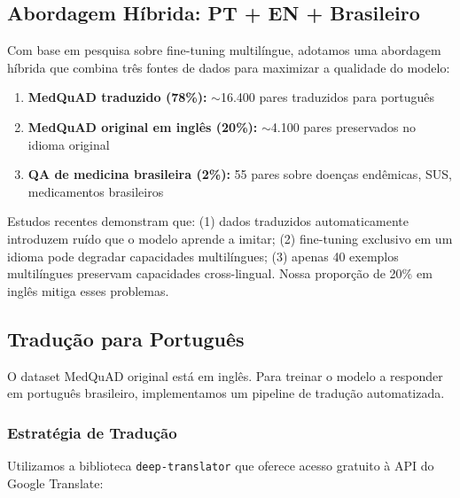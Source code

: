 \subsection{Abordagem Híbrida: PT + EN + Brasileiro}
\label{subsec:abordagem-hibrida}

Com base em pesquisa sobre fine-tuning multilíngue, adotamos uma abordagem híbrida que combina três fontes de dados para maximizar a qualidade do modelo:

\begin{enumerate}
    \item \textbf{MedQuAD traduzido (78\%):} $\sim$16.400 pares traduzidos para português
    \item \textbf{MedQuAD original em inglês (20\%):} $\sim$4.100 pares preservados no idioma original
    \item \textbf{QA de medicina brasileira (2\%):} 55 pares sobre doenças endêmicas, SUS, medicamentos brasileiros
\end{enumerate}

\begin{infobox}
Estudos recentes demonstram que: (1) dados traduzidos automaticamente introduzem ruído que o modelo aprende a imitar; (2) fine-tuning exclusivo em um idioma pode degradar capacidades multilíngues; (3) apenas 40 exemplos multilíngues preservam capacidades cross-lingual. Nossa proporção de 20\% em inglês mitiga esses problemas.
\end{infobox}

\subsection{Tradução para Português}
\label{subsec:traducao}

O dataset MedQuAD original está em inglês. Para treinar o modelo a responder em português brasileiro, implementamos um pipeline de tradução automatizada.

\subsubsection{Estratégia de Tradução}

Utilizamos a biblioteca \texttt{deep-translator} que oferece acesso gratuito à API do Google Translate:

